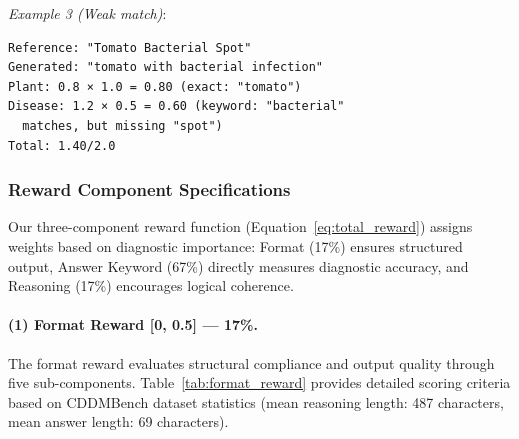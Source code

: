 \documentclass[11pt]{article}
\begin{document}
\noindent\textit{Example 3 (Weak match)}:

\vspace{1pt}
\begin{footnotesize}
\begin{verbatim}
Reference: "Tomato Bacterial Spot"
Generated: "tomato with bacterial infection"
Plant: 0.8 × 1.0 = 0.80 (exact: "tomato")
Disease: 1.2 × 0.5 = 0.60 (keyword: "bacterial"
  matches, but missing "spot")
Total: 1.40/2.0
\end{verbatim}
\end{footnotesize}
\vspace{2pt}

\subsubsection{Reward Component Specifications}

Our three-component reward function (Equation~\ref{eq:total_reward}) assigns weights based on diagnostic importance: Format (17\%) ensures structured output, Answer Keyword (67\%) directly measures diagnostic accuracy, and Reasoning (17\%) encourages logical coherence.

\paragraph{(1) Format Reward [0, 0.5] — 17\%.}

\noindent The format reward evaluates structural compliance and output quality through five sub-components. Table~\ref{tab:format_reward} provides detailed scoring criteria based on CDDMBench dataset statistics (mean reasoning length: 487 characters, mean answer length: 69 characters).
\end{document}
